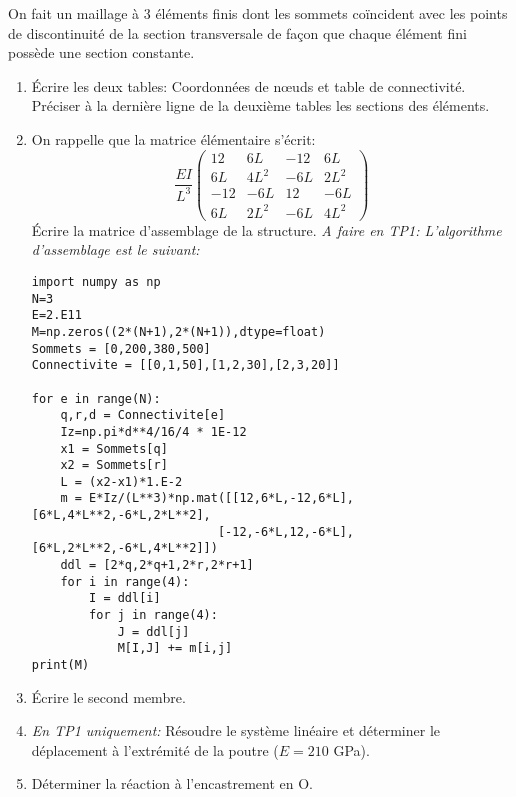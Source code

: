 \documentclass{article}
\begin{document}
On fait un maillage à 3 éléments finis dont les sommets coïncident avec les points de discontinuité de la section transversale de façon que chaque élément fini possède une section constante. 
\begin{enumerate}
\item Écrire les deux tables: Coordonnées de nœuds et table de connectivité. Préciser à la dernière ligne de la deuxième tables les sections des éléments.
\item  On rappelle que la matrice élémentaire s'écrit:
\[\frac{EI}{L^3}\left(\begin{array}{rrrr} 
12&6L&-12&6L\\
6L&4L^2&-6L&2L^2\\
-12&-6L&12&-6L\\
6L&2L^2&-6L&4L^2
\end{array}\right) 
\]
   Écrire la matrice d'assemblage de la structure. {\em A faire en TP1: L'algorithme d'assemblage est le suivant:}
\begin{verbatim}
import numpy as np
N=3
E=2.E11
M=np.zeros((2*(N+1),2*(N+1)),dtype=float)
Sommets = [0,200,380,500]
Connectivite = [[0,1,50],[1,2,30],[2,3,20]]

for e in range(N):
    q,r,d = Connectivite[e]
    Iz=np.pi*d**4/16/4 * 1E-12
    x1 = Sommets[q]
    x2 = Sommets[r]
    L = (x2-x1)*1.E-2
    m = E*Iz/(L**3)*np.mat([[12,6*L,-12,6*L],[6*L,4*L**2,-6*L,2*L**2],
                          [-12,-6*L,12,-6*L],[6*L,2*L**2,-6*L,4*L**2]])
    ddl = [2*q,2*q+1,2*r,2*r+1]
    for i in range(4):
        I = ddl[i]
        for j in range(4):
            J = ddl[j]
            M[I,J] += m[i,j]
print(M)
\end{verbatim}
\item Écrire le second membre.
\item {\em En TP1 uniquement:} Résoudre le système linéaire et déterminer le déplacement à l'extrémité de la poutre ($E=210$ GPa).
\item  Déterminer la réaction à l'encastrement en O.
\end{enumerate}
\end{document}
